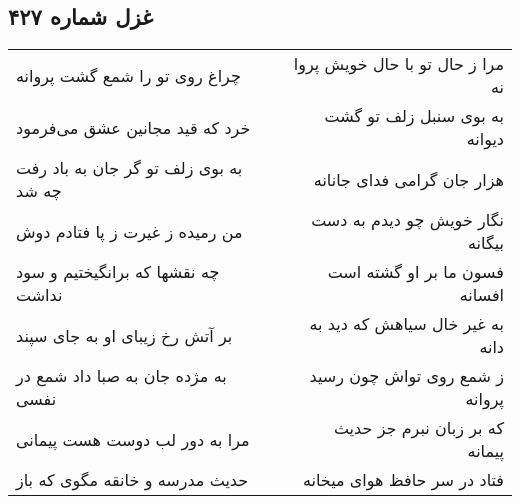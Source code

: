\begin{center}
\section*{غزل شماره ۴۲۷}
\label{sec:sh427}
\begin{longtable}{l p{0.5cm} r}
چراغ روی تو را شمع گشت پروانه
&&
مرا ز حال تو با حال خویش پروا نه
\\
خرد که قید مجانین عشق می‌فرمود
&&
به بوی سنبل زلف تو گشت دیوانه
\\
به بوی زلف تو گر جان به باد رفت چه شد
&&
هزار جان گرامی فدای جانانه
\\
من رمیده ز غیرت ز پا فتادم دوش
&&
نگار خویش چو دیدم به دست بیگانه
\\
چه نقشها که برانگیختیم و سود نداشت
&&
فسون ما بر او گشته است افسانه
\\
بر آتش رخ زیبای او به جای سپند
&&
به غیر خال سیاهش که دید به دانه
\\
به مژده جان به صبا داد شمع در نفسی
&&
ز شمع روی تواش چون رسید پروانه
\\
مرا به دور لب دوست هست پیمانی
&&
که بر زبان نبرم جز حدیث پیمانه
\\
حدیث مدرسه و خانقه مگوی که باز
&&
فتاد در سر حافظ هوای میخانه
\\
\end{longtable}
\end{center}
